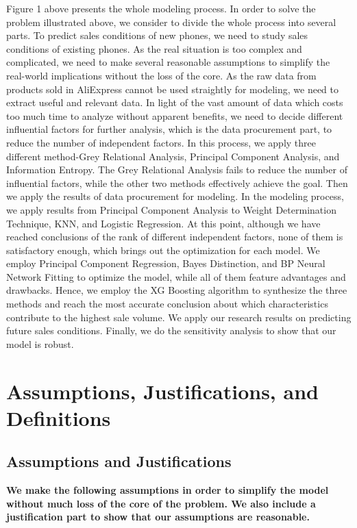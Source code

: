 Figure 1 above presents the whole modeling process. In order to solve the problem illustrated above, we consider to divide the whole process into several parts. To predict sales conditions of new phones, we need to study sales conditions of existing phones. As the real situation is too complex and complicated, we need to make several reasonable assumptions to simplify the real-world implications without the loss of the core. As the raw data from products sold in AliExpress cannot be used straightly for modeling, we need to extract useful and relevant data. In light of the vast amount of data which costs too much time to analyze without apparent benefits, we need to decide different influential factors for further analysis, which is the data procurement part, to reduce the number of independent factors. In this process, we apply three different method-Grey Relational Analysis, Principal Component Analysis, and Information Entropy. The Grey Relational Analysis fails to reduce the number of influential factors, while the other two methods effectively achieve the goal. Then we apply the results of data procurement for modeling. In the modeling process, we apply results from Principal Component Analysis to Weight Determination Technique, KNN, and Logistic Regression. At this point, although we have reached conclusions of the rank of different independent factors, none of them is satisfactory enough, which brings out the optimization for each model. We employ Principal Component Regression, Bayes Distinction, and BP Neural Network Fitting to optimize the model, while all of them feature advantages and drawbacks. Hence, we employ the XG Boosting algorithm to synthesize the three methods and reach the most accurate conclusion about which characteristics contribute to the highest sale volume. We apply our research results on predicting future sales conditions. Finally, we do the sensitivity analysis to show that our model is robust.

\section{Assumptions, Justifications, and Definitions}

\subsection{Assumptions and Justifications}

\textbf{We make the following assumptions in order to simplify the model without much loss of the core of the problem. We also include a justification part to show that our assumptions are reasonable.}

